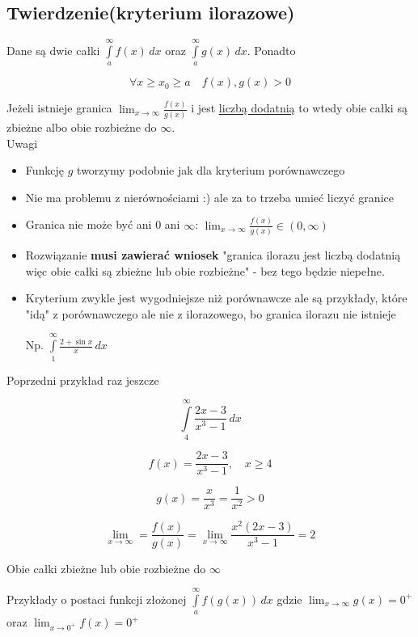 \subsection{Twierdzenie(kryterium ilorazowe)}

Dane są dwie całki $ \int\limits_a^\infty f(x) \,dx $ oraz $ \int\limits_{a}^{\infty} g(x) \,dx $. Ponadto

$$ \forall x \geq x_0 \geq a \quad f(x), g(x) > 0 $$

Jeżeli istnieje granica $ \lim_{x \to \infty} \frac{f(x)}{g(x)} $ i jest \underline{liczbą dodatnią} to wtedy obie całki
są zbieżne albo obie rozbieżne do $\infty$. \\

Uwagi
\begin{itemize}
    \item Funkcję $g$ tworzymy podobnie jak dla kryterium porównawczego
    \item Nie ma problemu z nierównościami :) ale za to trzeba umieć liczyć granice
    \item Granica nie może być ani 0 ani $\infty$: $ \lim_{x \to \infty} \frac{f(x)}{g(x)} \in (0, \infty) $
    \item Rozwiązanie \textbf{musi zawierać wniosek} "granica ilorazu jest liczbą dodatnią więc obie całki
    są zbieżne lub obie rozbieżne" - bez tego będzie niepełne.
    \item Kryterium zwykle jest wygodniejsze niż porównawcze ale są przykłady, które "idą" z porównawczego ale nie z
    ilorazowego, bo granica ilorazu nie istnieje

    Np. $ \int\limits_{1}^{\infty} \frac{2 + \sin x}{x} \,dx $
\end{itemize}

\begin{przyklad}

Poprzedni przykład raz jeszcze 

$$ \int\limits_4^\infty \frac{2x - 3}{x^3 - 1} \,dx $$

$$ f(x) = \frac{2x - 3}{x^3 - 1}, \quad x \geq 4 $$

$$ g(x) = \frac{x}{x^3} = \frac{1}{x^2} > 0 $$

$$ \lim_{x \to \infty} = \frac{f(x)}{g(x)} = \lim_{x \to \infty} \frac{x^2(2x - 3)}{x^3 - 1} = 2 $$

Obie całki zbieżne lub obie rozbieżne do $\infty$
\end{przyklad}

Przykłady o postaci funkcji złożonej $ \int\limits_{a}^{\infty} f(g(x)) \,dx $
gdzie $ \lim_{x \to \infty} g(x) = 0^+ $ oraz $ \lim_{x \to 0^+} f(x) = 0^+ $

